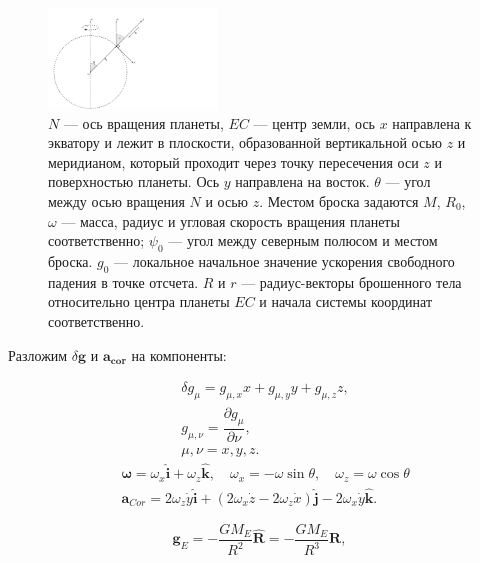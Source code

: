 \documentclass[hoptionsi, twocolumn]{revtex4-2}
\begin{document}
\begin{figure}[h]
\centering
\includegraphics[width=0.4\textwidth]{pick-1.pdf}
\caption{$N$ --- ось вращения планеты, $EC$ --- центр земли, ось $x$ направлена к экватору и  лежит в плоскости, образованной вертикальной осью $z$ и меридианом, который проходит через точку пересечения оси $z$ и поверхностью планеты. Ось $y$ направлена на восток. $\theta$ --- угол между осью вращения $N$ и осью $z$. Местом броска задаются $M$, $R_0$, $\omega$ --- масса, радиус и  угловая скорость вращения планеты соответственно; $\psi_0$ --- угол между северным полюсом и местом броска. $g_0$ --- локальное начальное значение ускорения свободного падения в точке отсчета. $R$ и $r$ --- радиус-векторы брошенного тела относительно центра планеты $EC$ и начала системы координат соответственно.}
\label{fig:pick-1}
\end{figure}

Разложим $\delta\bm g$ и $\bm{a_{cor}}$ на компоненты:

\begin{equation}
    \begin{aligned}
        &\delta g_{\mu} = g_{\mu, x}x + g_{\mu, y}y+g_{\mu,z}z,\\
        &g_{\mu, \nu}=\dfrac{\partial g_{\mu}}{\partial \nu},\\
    & \mu,\nu = x, y, z. \label{eq:6}
    \end{aligned}
\end{equation}
\begin{subequations}
    \begin{align}
        &\boldsymbol{\omega} = \omega_x\hat{\mathbf{i}}  + \omega_z\hat{\mathbf{k}}, \quad \omega_x = -\omega\sin{\theta}, \quad \omega_z = \omega\cos{\theta} \label{eq:7a}\\
        &\boldsymbol{a}_{Cor} = 2\omega_z\dot y\hat{\mathbf{i}} + (2\omega_x\dot z - 2\omega_z\dot x)\hat{\mathbf{j}}-2\omega_x\dot y\hat{\mathbf{k}}.\label{eq:7b}
    \end{align}
\end{subequations}

\begin{equation}
    \boldsymbol{g}_E = -\dfrac{GM_E}{R^2}\hat{\mathbf{R}} = -\dfrac{GM_E}{R^3}{\mathbf{R}},\label{eq:8}
\end{equation}
\end{document}
